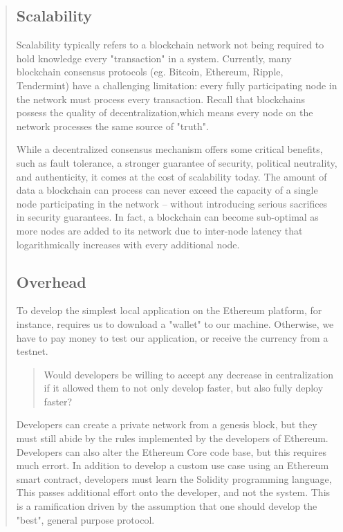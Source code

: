 \documentclass[12pt, titlepage, twocolumn]{report}
\begin{document}
\begin{quotation}
\subsection{Scalability}
Scalability typically refers to a blockchain network not being required to hold knowledge every "transaction" in a system. Currently, many blockchain consensus protocols (eg. Bitcoin, Ethereum, Ripple, Tendermint) have a challenging limitation: every fully participating node in the network must process every transaction. Recall that blockchains possess the quality of decentralization,which means every node on the network processes the same source of "truth".
 
While a decentralized consensus mechanism offers some critical benefits, such as fault tolerance, a stronger guarantee of security, political neutrality, and authenticity, it comes at the cost of scalability today. The amount of data a blockchain can process can never exceed the capacity of a single node participating in the network -- without introducing serious sacrifices in security guarantees. In fact, a blockchain can become sub-optimal as more nodes are added to its network due to inter-node latency that logarithmically increases with every additional node.
 

\subsection{Overhead}
To develop the simplest local application on the Ethereum platform, for instance, requires us to download a "wallet" to our machine. Otherwise, we have to pay money to test our application, or receive the currency from a testnet.

\begin{quotation}
Would developers be willing to accept any decrease in centralization if it allowed them to not only develop faster, but also fully deploy faster? 
 \end{quotation} 

Developers can create a private network from a genesis block, but they must still abide by the rules implemented by the developers of Ethereum. Developers can also alter the Ethereum Core code base, but this requires much errort. In addition to develop a custom use case using an Ethereum smart contract, developers must learn the Solidity programming language, This passes additional effort onto the developer, and not the system. This is a ramification driven by the assumption that one should develop the "best", general purpose protocol. 



\end{quotation}
\end{document}
